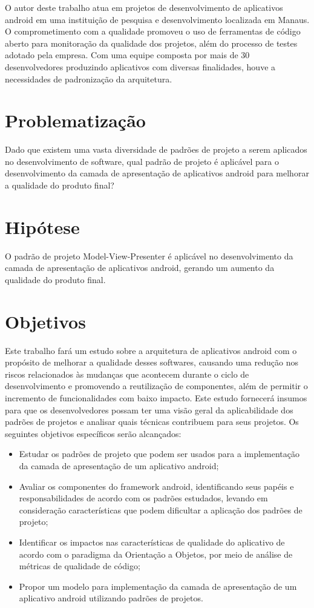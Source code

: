 O autor deste trabalho atua em projetos de desenvolvimento de aplicativos android em uma instituição de
pesquisa e desenvolvimento localizada em Manaus. O comprometimento com a
qualidade promoveu o uso de ferramentas de código aberto para monitoração da
qualidade dos projetos, além do processo de testes adotado pela empresa. Com uma
equipe composta por mais de 30 desenvolvedores produzindo aplicativos com
diversas finalidades, houve a necessidades de padronização da arquitetura.

\section{Problematização}
Dado que existem uma vasta diversidade de padrões de projeto a serem aplicados
no desenvolvimento de software, qual padrão de projeto é aplicável para o
desenvolvimento da camada de apresentação de aplicativos android para melhorar a
qualidade do produto final?

\section{Hipótese}

O padrão de projeto Model-View-Presenter é aplicável no desenvolvimento da
camada de apresentação de aplicativos android, gerando um aumento da qualidade
do produto final.

\section{Objetivos}

Este trabalho fará um estudo sobre a arquitetura de aplicativos android com o
propósito de melhorar a qualidade desses softwares, causando uma redução nos
riscos relacionados às mudanças que acontecem durante o ciclo de desenvolvimento
e promovendo a reutilização de componentes,  além de permitir o incremento de funcionalidades com
baixo impacto. Este estudo fornecerá insumos para que os desenvolvedores possam
ter uma visão geral da aplicabilidade dos padrões de projetos e analisar quais
técnicas contribuem para seus projetos. Os seguintes objetivos específicos serão alcançados:

\begin{itemize}
\item Estudar os padrões de projeto que podem ser usados para a implementação da
camada de apresentação de um aplicativo android;
\item Avaliar os componentes do  framework android, identificando seus papéis e
responsabilidades de acordo com os padrões estudados, levando  em consideração
características que podem dificultar a aplicação dos padrões de projeto;
\item Identificar os impactos nas características de qualidade do aplicativo de acordo
com o paradigma da Orientação a Objetos, por meio de análise de métricas de
qualidade de código;
\item Propor um modelo para implementação da camada de
apresentação de um aplicativo android utilizando padrões de projetos.
\end{itemize}

